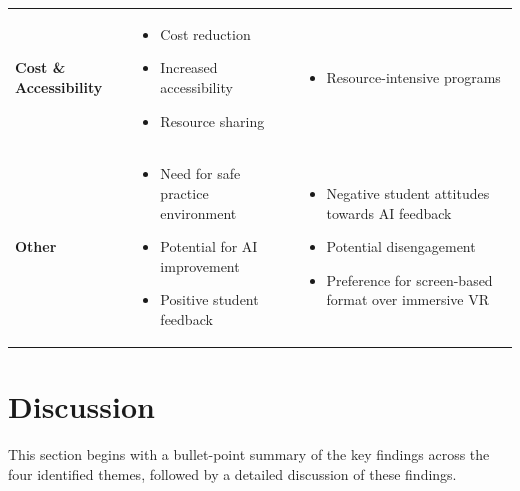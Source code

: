 \begin{table}[htbp]
\begin{tabular}{%
       >{\centering\arraybackslash}m{}%
       >{\raggedright\arraybackslash}m{}%
       >{\raggedright\arraybackslash}m{}%
   }
       \textbf{Cost \& Accessibility} &
       \begin{itemize}[leftmargin=*, topsep=2pt, itemsep=2pt, parsep=0pt]
           \item Cost reduction \cite{maicher_using_2019}
           \item Increased accessibility \cite{brugge_large_2024}
           \item Resource sharing \cite{wang_artificial_2025}
       \end{itemize}
       &
       \begin{itemize}[leftmargin=*, topsep=2pt, itemsep=2pt, parsep=0pt]
           \item Resource-intensive programs \cite{maicher_artificial_2023}
       \end{itemize}
       \\

       \textbf{Other} &
       \begin{itemize}[leftmargin=*, topsep=2pt, itemsep=2pt, parsep=0pt]
           \item Need for safe practice environment \cite{de_mattei_are_2024}
           \item Potential for AI improvement \cite{de_mattei_are_2024}
           \item Positive student feedback \cite{maicher_artificial_2023}
       \end{itemize}
       &
       \begin{itemize}[leftmargin=*, topsep=2pt, itemsep=2pt, parsep=0pt]
           \item Negative student attitudes towards AI feedback \cite{holderried_language_2024}
           \item Potential disengagement \cite{s_afzal_ai_2020}
           \item Preference for screen-based format over immersive VR \cite{anthamatten_integrating_2024}
       \end{itemize}
       \\
       \bottomrule
   \end{tabular}
   \label{tab:factors}
\end{table}


\section*{\textbf{Discussion}}

This section begins with a bullet-point summary of the key findings across the four identified themes, followed by a detailed discussion of these findings.

